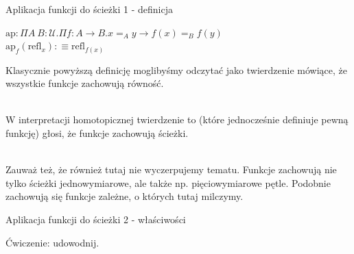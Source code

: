 \documentclass{beamer}
\newcommand{\defn}{:\equiv}
\newcommand{\U}{\mathcal{U}}
\newcommand{\refl}[1]{\text{refl}_{#1}}
\newcommand{\ap}[2]{\text{ap}_{#1}(#2)}
\begin{document}
\begin{frame}{Aplikacja funkcji do ścieżki 1 - definicja}

\begin{definition}

$\text{ap} : \Pi A\ B : \U. \Pi f : A \to B. x =_A y \to f(x) =_B f(y)$ \\
$\ap{f}{\refl{x}} \defn \refl{f(x)}$

\end{definition}

Klasycznie powyższą definicję moglibyśmy odczytać jako twierdzenie mówiące, że wszystkie funkcje zachowują równość. \\~\

W interpretacji homotopicznej twierdzenie to (które jednocześnie definiuje pewną funkcję) głosi, że funkcje zachowują ścieżki. \\~\

Zauważ też, że również tutaj nie wyczerpujemy tematu. Funkcje zachowują nie tylko ścieżki jednowymiarowe, ale także np. pięciowymiarowe pętle. Podobnie zachowują się funkcje zależne, o których tutaj milczymy.

\end{frame}

\begin{frame}{Aplikacja funkcji do ścieżki 2 - właściwości}

Ćwiczenie: udowodnij.

\end{frame}
\end{document}
